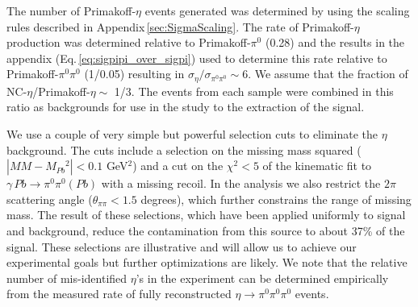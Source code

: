 The number of Primakoff-$\eta$ events generated was determined by using the scaling rules  described in Appendix\,\ref{sec:SigmaScaling}. The rate of Primakoff-$\eta$ production was determined relative to Primakoff-$\pi^0$ (0.28) and the results in the appendix (Eq.\,\ref{eq:sigpipi_over_sigpi}) used to determine this rate relative to Primakoff-$\pi^0\pi^0$ (1/0.05) resulting in $\sigma_\eta/\sigma_{\pi^0\pi^0} \sim 6$. We assume that the fraction of NC-$\eta$/Primakoff-$\eta \sim$ 1/3. The events from each sample were combined in this ratio as backgrounds for use in the study to the extraction of the signal.

We use a couple of very simple but powerful selection cuts to eliminate the $\eta$ background. The cuts include a selection on the missing mass squared ($|MM - M_{Pb}{^2}| < 0.1$ GeV$^2$) and a cut on the $\chi^2 < 5$ of the kinematic fit to $\gamma\,Pb\rightarrow \pi^0\pi^0 (Pb)$ with a missing recoil. In the analysis we also restrict the $2\pi$ scattering angle  ($\theta_{\pi\pi} <1.5$ degrees), which further constrains the range of missing mass. The result of these selections, which have been applied uniformly to signal and background, reduce the contamination from this source to about 37\% of the signal. These selections are illustrative and will allow us to achieve our experimental goals but further optimizations are likely. We note that the relative number of mis-identified $\eta$'s in the experiment can be determined empirically from the measured rate of fully reconstructed $\eta\rightarrow\pi^0\pi^0\pi^0$ events.

